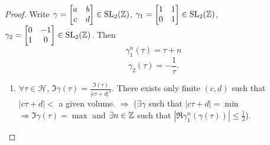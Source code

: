 \begin{proof}
  Write $\gamma=\begin{bmatrix} a&b\\c&d \end{bmatrix} \in \operatorname{SL}_2(\mathbb{Z})$, $\gamma_1=\begin{bmatrix} 1&1\\0&1 \end{bmatrix} \in \operatorname{SL}_2(\mathbb{Z})$, $\gamma_2=\begin{bmatrix} 0&-1\\1&0 \end{bmatrix} \in \operatorname{SL}_2(\mathbb{Z})$. Then
  \[
    \gamma_1^{n}(\tau)=\tau+n
  \] 
  \[
    \gamma_2(\tau)=-\frac{1}{\tau}.
  \] 
  \begin{enumerate}
    \item $\forall \tau \in \mathcal{H}$, $\Im\gamma(\tau)= \frac{\Im(\tau)}{|c\tau+d|^2}$. There exists only finite $(c,d)$ such that $|c\tau+d|<$ a given volume. $\Rightarrow$ ($\exists \gamma $ such that $|c\tau+d|=\min$ $\Rightarrow \Im\gamma(\tau)=\max$ and $\exists n\in \mathbb{Z}$ such that $|\Re\gamma_1^{n}(\gamma(\tau))|\le \frac{1}{2}$).


\end{enumerate}
\end{proof}
